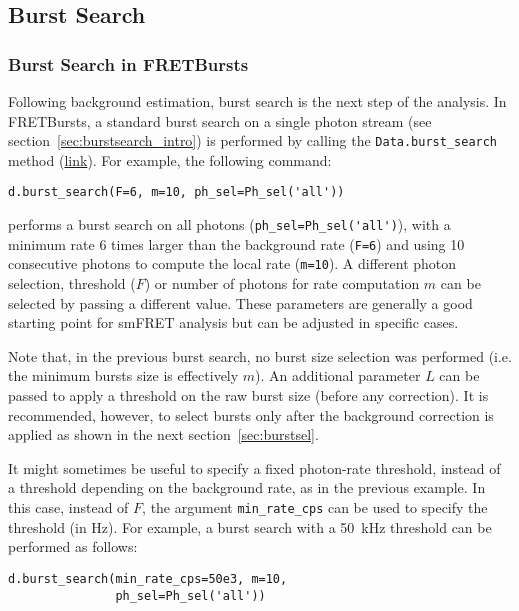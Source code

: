 \subsection{Burst Search}
\label{sec:burstsearch}

\subsubsection{Burst Search in FRETBursts}
\label{sec:burstsearch_code}

Following background estimation, burst search is the next step of
the analysis.
In FRETBursts, a standard burst search on a single photon stream
(see section~\ref{sec:burstsearch_intro}) is performed by calling the
\verb|Data.burst_search| method
(\href{http://fretbursts.readthedocs.org/en/latest/data_class.html#fretbursts.burstlib.Data.burst_search}{link}).
For example, the following command:

\begin{lstlisting}
d.burst_search(F=6, m=10, ph_sel=Ph_sel('all'))
\end{lstlisting}

performs a burst search on all photons
(\verb|ph_sel=Ph_sel('all')|), with a minimum rate 6 times larger than the
background rate (\verb|F=6|) and using 10 consecutive photons to compute the
local rate (\verb|m=10|).
A different photon selection, threshold ($F$) or number of photons for rate
computation $m$ can be selected by passing a different value. These parameters
are generally a good starting point for smFRET analysis but can be adjusted in
specific cases.

Note that, in the previous burst search, no burst size selection was performed
(i.e. the minimum bursts size is effectively $m$).
An additional parameter $L$ can be passed to apply a threshold on the raw burst
size (before any correction).
It is recommended, however, to select bursts only after the background correction
is applied as shown in the next section~\ref{sec:burstsel}.

It might sometimes be useful to specify a fixed photon-rate threshold, instead
of a threshold depending on the background rate, as in the previous example. In
this case, instead of $F$, the argument \verb|min_rate_cps| can be used to
specify the threshold (in Hz). For example, a burst search with a 50~kHz
threshold can be performed as follows:

\begin{lstlisting}
d.burst_search(min_rate_cps=50e3, m=10, 
               ph_sel=Ph_sel('all'))
\end{lstlisting}

